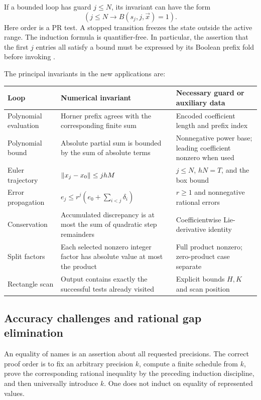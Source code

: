 If a bounded loop has guard $j\le N$, its invariant can have the form
\[
 (j\le N\longrightarrow B(s_j,j,\vec x)=1).
\]
Here order is a PR test. A stopped transition freezes the state outside
the active range. The induction formula is quantifier-free. In particular,
the assertion that the first $j$ entries all satisfy a bound must be
expressed by its Boolean prefix fold before invoking .

The principal invariants in the new applications are:
\begin{longtable}{@{}>{\raggedright\arraybackslash}p{.22\linewidth}>{\raggedright\arraybackslash}p{.42\linewidth}>{\raggedright\arraybackslash}p{.30\linewidth}@{}}
\toprule
Loop & Numerical invariant & Necessary guard or auxiliary data \\
\midrule\endhead
Polynomial evaluation & Horner prefix agrees with the corresponding finite
sum & Encoded coefficient length and prefix index \\
Polynomial bound & Absolute partial sum is bounded by the sum of absolute
terms & Nonnegative power base; leading coefficient nonzero when used \\
Euler trajectory & $\left\lVert x_j-x_0\right\rVert\le jhM$ & $j\le N$,
$hN=T$, and the box bound \\
Error propagation & $e_j\le r^j(e_0+\sum_{i<j}\delta_i)$ & $r\ge1$
and nonnegative rational errors \\
Conservation & Accumulated discrepancy is at most the sum
of quadratic step remainders & Coefficientwise Lie-derivative identity \\
Split factors & Each selected nonzero integer factor has absolute value
at most the product & Full product nonzero; zero-product case separate \\
Rectangle scan & Output contains exactly the successful tests already
visited & Explicit bounds $H,K$ and scan position \\
\bottomrule
\end{longtable}

\subsection{Accuracy challenges and rational gap elimination}

An equality of names is an assertion about all requested precisions. The
correct proof order is to fix an arbitrary precision $k$, compute a finite
schedule from $k$, prove the corresponding rational inequality by the
preceding induction discipline, and then universally introduce $k$.
One does not induct on equality of represented values.


